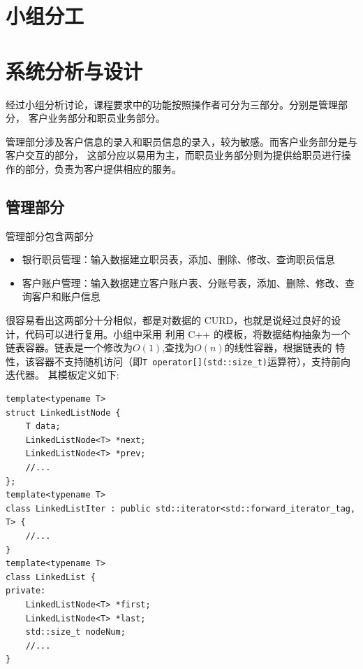 \documentclass{ctexrep}
\begin{document}




\tableofcontents

\chapter{小组分工}


\chapter{系统分析与设计}
经过小组分析讨论，课程要求中的功能按照操作者可分为三部分。分别是管理部分，
客户业务部分和职员业务部分。

管理部分涉及客户信息的录入和职员信息的录入，较为敏感。而客户业务部分是与客户交互的部分，
这部分应以易用为主，而职员业务部分则为提供给职员进行操作的部分，负责为客户提供相应的服务。
\section{管理部分}
管理部分包含两部分
\begin{itemize}
  \item 银行职员管理：输入数据建立职员表，添加、删除、修改、查询职员信息
  \item 客户账户管理：输入数据建立客户账户表、分账号表，添加、删除、修改、查询客户和账户信息
\end{itemize}

很容易看出这两部分十分相似，都是对数据的 CURD，也就是说经过良好的设计，代码可以进行复用。小组中采用
利用 C++ 的模板，将数据结构抽象为一个链表容器。链表是一个修改为$O(1)$,查找为$O(n)$的线性容器，根据链表的
特性，该容器不支持随机访问（即\texttt{T operator[](std::size_t)}运算符），支持前向迭代器。
其模板定义如下:
\begin{verbatim}
template<typename T>
struct LinkedListNode {
    T data;
    LinkedListNode<T> *next;
    LinkedListNode<T> *prev;
    //...
};
template<typename T>
class LinkedListIter : public std::iterator<std::forward_iterator_tag, T> {
    //...
}
template<typename T>
class LinkedList {
private:
    LinkedListNode<T> *first;
    LinkedListNode<T> *last;
    std::size_t nodeNum;
    //...
}
\end{verbatim}
\end{document}

